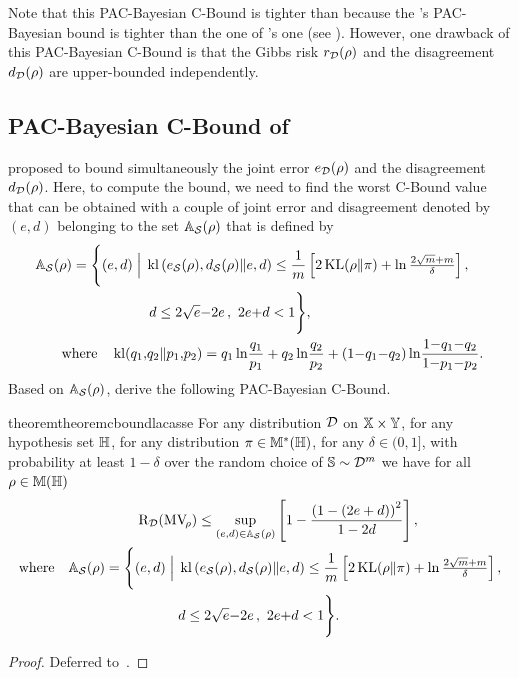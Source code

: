 Note that this PAC-Bayesian C-Bound is tighter than  because the \citeauthor{Seeger2002}'s PAC-Bayesian bound is tighter than the one of \citeauthor{McAllester2003}'s one (see ).
However, one drawback of this PAC-Bayesian C-Bound is that the Gibbs risk 
$r_{\mathcal{D}}(\rho)$ and the disagreement $d_{\mathcal{D}}(\rho)$ are upper-bounded independently.

\subsection{PAC-Bayesian C-Bound of \protect\citeauthor{LacasseLavioletteMarchandGermainUsunier2006}}
\label{chap:mv:section:pac-bayesian-e-d}

\citet{LacasseLavioletteMarchandGermainUsunier2006} proposed to bound simultaneously the joint error $e_{\mathcal{D}}(\rho)$ and the disagreement $d_{\mathcal{D}}(\rho)$.
Here, to compute the bound, we need to find the worst C-Bound value that can be obtained with a couple of joint error and disagreement denoted by $(e,d)$ belonging to the set $\mathbb{A}_{\mathcal{S}}(\rho)$ that is defined by
\begin{align*}
\Abb_{\dS}(\Q) = \Bigg\{ (e, d) \;\Big|\; &\kl\LP e_{\dS}(\Q),  d_{\dS}(\Q)\|e, d\RP \le \frac{1}{\m}\LB 2\KL(\Q\|\P) + \ln\tfrac{2\sqrt{\m}+\m}{\delta}\RB,\\
&\hspace{0.1cm}d\le 2 \sqrt{e}{-}2e\,,\ 2e{+}d<1\Bigg\},\\
&\hspace{-2.1cm}\text{where}\quad \kl(q_1{,} q_2\| p_1{,} p_2) = q_1\ln\!\frac{q_1}{p_1} + q_2 \ln\!\frac{q_2}{p_2} + (1{-}q_1{-}q_2)\ln\!\frac{1{-}q_1{-}q_2}{1{-}p_1{-}p_2}.
\end{align*}
Based on $\mathbb{A}_{\mathcal{S}}(\rho)$, \citet{LacasseLavioletteMarchandGermainUsunier2006} derive the following PAC-Bayesian C-Bound. 

\begin{restatable}{theorem}{theoremcboundlacasse}\label{chap:mv:theorem:cbound-lacasse}
For any distribution $\mathcal{D}$ on $\mathbb{X}\times\mathbb{Y}$, for any hypothesis set $\mathbb{H}$, for any distribution $\pi\in\mathbb{M}^{*}(\mathbb{H})$, for any $\delta\in(0,1]$, with probability at least $1-\delta$ over the random choice of $\mathbb{S}\sim\mathcal{D}^m$ we have for all $\rho\in\mathbb{M}(\mathbb{H})$
\begin{align*}
&\hspace{-1cm}\Risk_{\D}(\MVQ) \le \sup_{(e, d)\in \Abb_{\dS}(\Q)} \LB 1- \frac{\LP 1-(2e+d)\RP^2}{1-2d} \RB,\\
\text{where}\quad \Abb_{\dS}(\Q) = \Bigg\{ (e, d) \;\Big|\; &\kl\LP e_{\dS}(\Q),  d_{\dS}(\Q)\|e, d\RP \le \frac{1}{\m}\LB 2\KL(\Q\|\P) + \ln\tfrac{2\sqrt{\m}+\m}{\delta}\RB,\\
&d\le 2 \sqrt{e}{-}2e\,,\ 2e{+}d<1\Bigg\}.
\end{align*}
\end{restatable}
\begin{noaddcontents}\begin{proof}
Deferred to~.
\end{proof}\end{noaddcontents}

